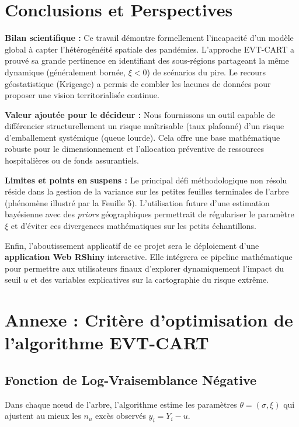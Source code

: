 \documentclass[11pt,a4paper]{article}
\begin{document}
\section{Conclusions et Perspectives}

\textbf{Bilan scientifique :} Ce travail démontre formellement l'incapacité d'un modèle global à capter l'hétérogénéité spatiale des pandémies. L'approche EVT-CART a prouvé sa grande pertinence en identifiant des sous-régions partageant la même dynamique (généralement bornée, $\xi < 0$) de scénarios du pire. Le recours géostatistique (Krigeage) a permis de combler les lacunes de données pour proposer une vision territorialisée continue.

\textbf{Valeur ajoutée pour le décideur :} Nous fournissons un outil capable de différencier structurellement un risque maîtrisable (taux plafonné) d'un risque d'emballement systémique (queue lourde). Cela offre une base mathématique robuste pour le dimensionnement et l'allocation préventive de ressources hospitalières ou de fonds assurantiels.

\textbf{Limites et points en suspens :}
Le principal défi méthodologique non résolu réside dans la gestion de la variance sur les petites feuilles terminales de l'arbre (phénomène illustré par la Feuille 5). L'utilisation future d'une estimation bayésienne avec des \textit{priors} géographiques permettrait de régulariser le paramètre $\xi$ et d'éviter ces divergences mathématiques sur les petits échantillons.

Enfin, l'aboutissement applicatif de ce projet sera le déploiement d'une \textbf{application Web RShiny} interactive. Elle intégrera ce pipeline mathématique pour permettre aux utilisateurs finaux d'explorer dynamiquement l'impact du seuil $u$ et des variables explicatives sur la cartographie du risque extrême.

\newpage
\appendix
\section{Annexe : Critère d'optimisation de l'algorithme EVT-CART}

\subsection{Fonction de Log-Vraisemblance Négative}
Dans chaque nœud de l'arbre, l'algorithme estime les paramètres $\theta = (\sigma, \xi)$ qui ajustent au mieux les $n_u$ excès observés $y_i = Y_i - u$. 
\end{document}
